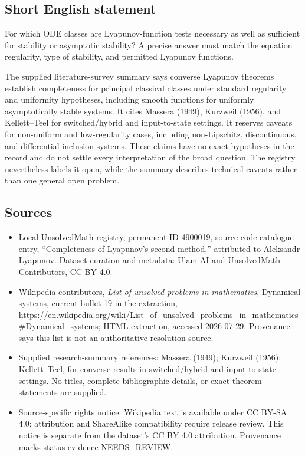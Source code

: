 \documentclass[11pt]{article}
\begin{document}
\subsection{Short English statement}
For which ODE classes are Lyapunov-function tests necessary as well as sufficient for stability or asymptotic stability? A precise answer must match the equation regularity, type of stability, and permitted Lyapunov functions.

The supplied literature-survey summary says converse Lyapunov theorems establish completeness for principal classical classes under standard regularity and uniformity hypotheses, including smooth functions for uniformly asymptotically stable systems. It cites Massera (1949), Kurzweil (1956), and Kellett--Teel for switched/hybrid and input-to-state settings. It reserves caveats for non-uniform and low-regularity cases, including non-Lipschitz, discontinuous, and differential-inclusion systems. These claims have no exact hypotheses in the record and do not settle every interpretation of the broad question. The registry nevertheless labels it open, while the summary describes technical caveats rather than one general open problem.
\subsection{Sources}
\begin{itemize}
\item Local UnsolvedMath registry, permanent ID 4900019, source code catalogue entry, ``Completeness of Lyapunov's second method,'' attributed to Aleksandr Lyapunov. Dataset curation and metadata: Ulam AI and UnsolvedMath Contributors, CC BY 4.0.
\item Wikipedia contributors, \emph{List of unsolved problems in mathematics}, Dynamical systems, current bullet 19 in the extraction, \url{https://en.wikipedia.org/wiki/List_of_unsolved_problems_in_mathematics#Dynamical_systems}; HTML extraction, accessed 2026-07-29. Provenance says this list is not an authoritative resolution source.
\item Supplied research-summary references: Massera (1949); Kurzweil (1956); Kellett--Teel, for converse results in switched/hybrid and input-to-state settings. No titles, complete bibliographic details, or exact theorem statements are supplied.
\item Source-specific rights notice: Wikipedia text is available under CC BY-SA 4.0; attribution and ShareAlike compatibility require release review. This notice is separate from the dataset's CC BY 4.0 attribution. Provenance marks status evidence NEEDS\_REVIEW.
\end{itemize}
\end{document}
